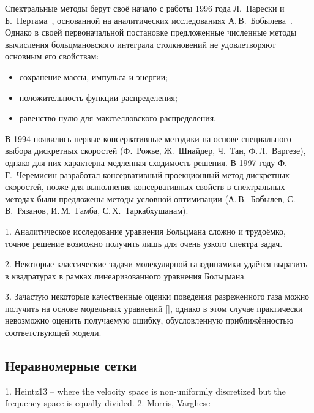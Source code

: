 

Спектральные методы берут своё начало с работы 1996 года Л.~Парески и Б.~Пертама~\cite{Pareschi1996},
основанной на аналитических исследованиях А.\,В.~Бобылева~\cite{Bobylev1984}.
Однако в своей первоначальной постановке предложенные численные методы вычисления
больцмановского интеграла столкновений не удовлетворяют основным его свойствам:
\begin{itemize}
    \item сохранение массы, импульса и энергии;
    \item положительность функции распределения;
    \item равенство нулю для максвелловского распределения.
\end{itemize}
В 1994 появились первые консервативные методики на основе специального выбора
дискретных скоростей (Ф.~Рожье, Ж.~Шнайдер, Ч.~Тан, Ф.\,Л.~Варгезе),
однако для них характерна медленная сходимость решения.
В 1997 году Ф.\,Г.~Черемисин разработал консервативный проекционный метод дискретных скоростей,
позже для выполнения консервативных свойств в спектральных методах были предложены методы
условной оптимизации (А.\,В.~Бобылев, С.\,В.~Рязанов, И.\,М.~Гамба, С.\,Х.~Таркабхушанам).



1. Аналитическое исследование уравнения Больцмана сложно и трудоёмко,
точное решение возможно получить лишь для очень узкого спектра задач.

2. Некоторые классические задачи молекулярной газодинамики удаётся выразить в квадратурах
в рамках линеаризованного уравнения Больцмана.

3. Зачастую некоторые качественные оценки поведения разреженного газа можно получить на основе модельных уравнений [],
однако в этом случае практически невозможно оценить получаемую ошибку, обусловленную приближённостью соответствующей модели.


\subsection{Неравномерные сетки}
1. Heintz13 -- where the velocity space is non-uniformly discretized but the frequency space is equally divided.
2. Morris, Varghese

